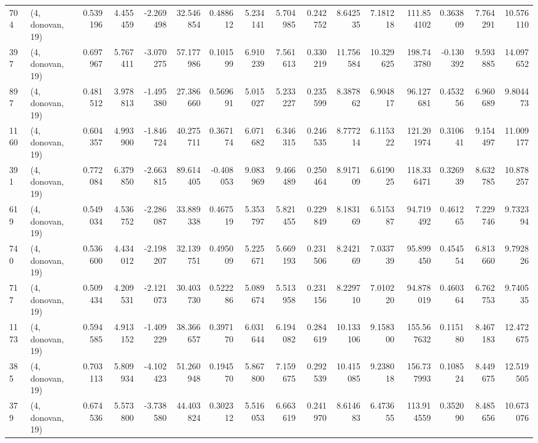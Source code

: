 \begin{tabular}{llrrrrrrrrrrrrrr}
704  &  (4, donovan, 19) &   0.539196 &   4.455459 &  -2.269498 &     32.546854 &    0.488612 &    5.234141 &    5.704985 &  0.242752 &   8.642535 &   7.181218 &   111.854102 &   0.363809 &   7.764291 &  10.576110 \\
397  &  (4, donovan, 19) &   0.697967 &   5.767411 &  -3.070275 &     57.177986 &    0.101599 &    6.910239 &    7.561613 &  0.330219 &  11.756584 &  10.329625 &   198.743780 &  -0.130392 &   9.593885 &  14.097652 \\
897  &  (4, donovan, 19) &   0.481512 &   3.978813 &  -1.495380 &     27.386660 &    0.569691 &    5.015027 &    5.233227 &  0.235599 &   8.387862 &   6.904817 &    96.127681 &   0.453256 &   6.960689 &   9.804473 \\
1160 &  (4, donovan, 19) &   0.604357 &   4.993900 &  -1.846724 &     40.275711 &    0.367174 &    6.071682 &    6.346315 &  0.246535 &   8.777214 &   6.115322 &   121.201974 &   0.310641 &   9.154497 &  11.009177 \\
391  &  (4, donovan, 19) &   0.772084 &   6.379850 &  -2.663815 &     89.614405 &   -0.408053 &    9.083969 &    9.466489 &  0.250464 &   8.917109 &   6.619025 &   118.336471 &   0.326939 &   8.632785 &  10.878257 \\
619  &  (4, donovan, 19) &   0.549034 &   4.536752 &  -2.286087 &     33.889338 &    0.467519 &    5.353797 &    5.821455 &  0.229849 &   8.183169 &   6.515387 &    94.719492 &   0.461265 &   7.229746 &   9.732394 \\
740  &  (4, donovan, 19) &   0.536600 &   4.434012 &  -2.198207 &     32.139751 &    0.495009 &    5.225671 &    5.669193 &  0.231506 &   8.242169 &   7.033739 &    95.899450 &   0.454554 &   6.813660 &   9.792826 \\
717  &  (4, donovan, 19) &   0.509434 &   4.209531 &  -2.121073 &     30.403730 &    0.522286 &    5.089674 &    5.513958 &  0.231156 &   8.229710 &   7.010220 &    94.878019 &   0.460364 &   6.762753 &   9.740535 \\
1173 &  (4, donovan, 19) &   0.594585 &   4.913152 &  -1.409229 &     38.366657 &    0.397170 &    6.031644 &    6.194082 &  0.284619 &  10.133106 &   9.158300 &   155.567632 &   0.115180 &   8.467183 &  12.472675 \\
385  &  (4, donovan, 19) &   0.703113 &   5.809934 &  -4.102423 &     51.260948 &    0.194570 &    5.867800 &    7.159675 &  0.292539 &  10.415085 &   9.238018 &   156.737993 &   0.108524 &   8.449675 &  12.519505 \\
379  &  (4, donovan, 19) &   0.674536 &   5.573800 &  -3.738580 &     44.403824 &    0.302312 &    5.516053 &    6.663619 &  0.241970 &   8.614683 &   6.473655 &   113.914559 &   0.352090 &   8.485656 &  10.673076 \\

\end{tabular}
